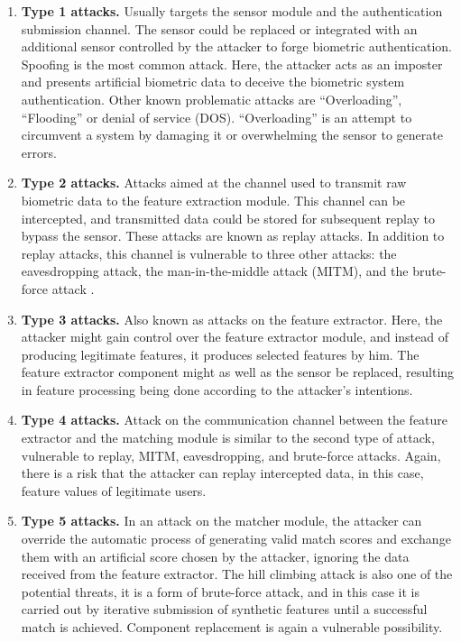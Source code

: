 \label{Security vulnerable points description}
\begin{enumerate}
    \item \textbf{Type 1 attacks.} Usually targets the sensor module and the authentication submission channel. The sensor could be replaced or integrated with an additional sensor controlled by the attacker to forge biometric authentication. Spoofing is the most common attack. Here, the attacker acts as an imposter and presents artificial biometric data to deceive the biometric system authentication. Other known problematic attacks are ``Overloading'', ``Flooding'' or denial of service (DOS). ``Overloading'' is an attempt to circumvent a system by damaging it or overwhelming the sensor to generate errors. 
     \item \textbf{Type 2 attacks.} Attacks aimed at the channel used to transmit raw biometric data to the feature extraction module. This channel can be intercepted, and transmitted data could be stored for subsequent replay to bypass the sensor. These attacks are known as replay attacks. In addition to replay attacks, this channel is vulnerable to three other attacks: the eavesdropping attack, the man-in-the-middle attack (MITM), and the brute-force attack \cite{ReplayAttackDefinition}.
     \item \textbf{Type 3 attacks.} Also known as attacks on the feature extractor. Here, the attacker might gain control over the feature extractor module, and instead of producing legitimate features, it produces selected features by him. The feature extractor component might as well as the sensor be replaced, resulting in feature processing being done according to the attacker's intentions.
     \item \textbf{Type 4 attacks.} Attack on the communication channel between the feature extractor and the matching module is similar to the second type of attack, vulnerable to replay, MITM, eavesdropping, and brute-force attacks. Again, there is a risk that the attacker can replay intercepted data, in this case, feature values of legitimate users.
    \item \textbf{Type 5 attacks.} In an attack on the matcher module, the attacker can override the automatic process of generating valid match scores and exchange them with an artificial score chosen by the attacker, ignoring the data received from the feature extractor. The hill climbing attack is also one of the potential threats, it is a form of brute-force attack, and in this case it is carried out by iterative submission of synthetic features until a successful match is achieved\cite{HillClimbingAttacks}. Component replacement is again a vulnerable possibility.

\end{enumerate}
